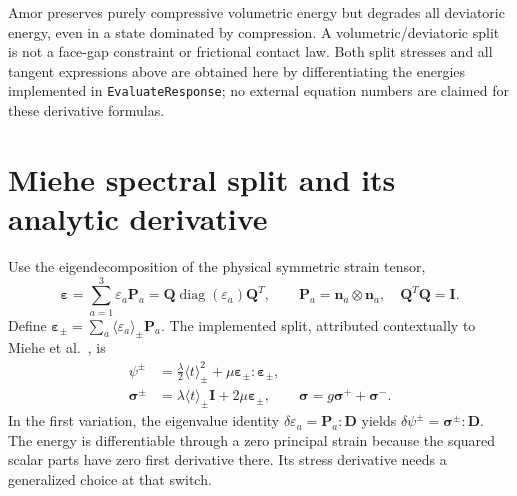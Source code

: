 \documentclass[11pt,a4paper]{article}
\newcommand{\eps}{\bm{\varepsilon}}
\newcommand{\sig}{\bm{\sigma}}
\newcommand{\I}{\bm{I}}
\newcommand{\D}{\bm{D}}
\newcommand{\code}[1]{\texttt{\small #1}}
\newcommand{\sectionpage}[1]{\clearpage\section{#1}}
\numberwithin{equation}{section}
\begin{document}
Amor preserves purely compressive volumetric energy but degrades all deviatoric
energy, even in a state dominated by compression. A volumetric/deviatoric split
is not a face-gap constraint or frictional contact law. Both split stresses and
all tangent expressions above are obtained here by differentiating the energies
implemented in \code{EvaluateResponse}; no external equation numbers are claimed
for these derivative formulas.

\sectionpage{Miehe spectral split and its analytic derivative}
\label{sec:spectral}
Use the eigendecomposition of the physical symmetric strain tensor,
\begin{equation}
 \eps=\sum_{a=1}^{3}\varepsilon_a\bm P_a
 =\bm Q\operatorname{diag}(\varepsilon_a)\bm Q^T,
 \qquad\bm P_a=\bm n_a\otimes\bm n_a,\quad\bm Q^T\bm Q=\I.
\end{equation}
Define $\eps_\pm=\sum_a\langle\varepsilon_a\rangle_\pm\bm P_a$.
The implemented split, attributed contextually to Miehe et al.\ \cite{miehe}, is
\begin{align}
 \psi^\pm&=\frac\lambda2\langle t\rangle_\pm^2
                  +\mu\eps_\pm:\eps_\pm,\\
 \sig^\pm&=\lambda\langle t\rangle_\pm\I+2\mu\eps_\pm,
 \qquad\sig=g\sig^++\sig^-.\label{eq:spectral-stress}
\end{align}
In the first variation, the eigenvalue identity
$\delta\varepsilon_a=\bm P_a:\D$ yields
$\delta\psi^\pm=\sig^\pm:\D$. The energy is differentiable through a zero
principal strain because the squared scalar parts have zero first derivative
there. Its stress derivative needs a generalized choice at that switch.
\end{document}

